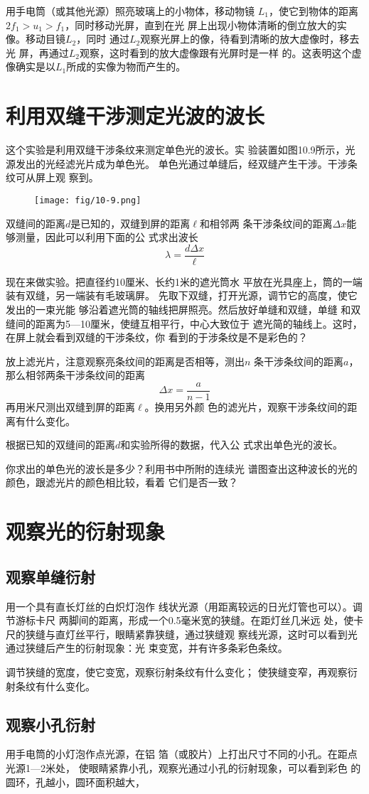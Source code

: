 用手电筒（或其他光源）照亮玻璃上的小物体，移动物镜
$L_1$，使它到物体的距离$2f_1>u_1>f_1$，同时移动光屏，直到在光
屏上出现小物体清晰的倒立放大的实像。移动目镜$L_2$，同时
通过$L_2$观察光屏上的像，待看到清晰的放大虚像时，移去光
屏，再通过$L_2$观察，这时看到的放大虚像跟有光屏时是一样
的。这表明这个虚像确实是以$L_1$所成的实像为物而产生的。

\section{利用双缝干涉测定光波的波长}

这个实验是利用双缝干涉条纹来测定单色光的波长。实
验装置如图10.9所示，光源发出的光经滤光片成为单色光。
单色光通过单缝后，经双缝产生干涉。干涉条纹可从屏上观
察到。
\begin{figure}[htp]\centering
    \texttt{[image: fig/10-9.png]}
    \caption{}
    \end{figure}

双缝间的距离$d$是已知的，双缝到屏的距离$\ell$和相邻两
条干涉条纹间的距离$\Delta x$能够测量，因此可以利用下面的公
式求出波长
\[\lambda=\frac{d\Delta x}{\ell} \]

现在来做实验。把直径约10厘米、长约1米的遮光筒水
平放在光具座上，筒的一端装有双缝，另一端装有毛玻璃屏。
先取下双缝，打开光源，调节它的高度，使它发出的一束光能
够沿着遮光筒的轴线把屏照亮。然后放好单缝和双缝，单缝
和双缝间的距离为5—10厘米，使缝互相平行，中心大致位于
遮光简的轴线上。这时，在屏上就会看到双缝的干涉条纹，你
看到的于涉条纹是不是彩色的？

放上滤光片，注意观察亮条纹间的距离是否相等，测出$n$
条干涉条纹间的距离$a$，那么相邻两条干涉条纹间的距离
\[\Delta x=\frac{a}{n-1} \]
再用米尺测出双缝到屏的距离$\ell$。换用另外颜
色的滤光片，观察干涉条纹间的距离有什么变化。

根据已知的双缝间的距离$d$和实验所得的数据，代入公
式求出单色光的波长。

你求出的单色光的波长是多少？利用书中所附的连续光
谱图查出这种波长的光的颜色，跟滤光片的颜色相比较，看着
它们是否一致？

\section{观察光的衍射现象}

\subsection{观察单缝衍射}

用一个具有直长灯丝的白炽灯泡作
线状光源（用距离较远的日光灯管也可以）。调节游标卡尺
两脚间的距离，形成一个0.5毫米宽的狭缝。在距灯丝几米远
处，使卡尺的狭缝与直灯丝平行，眼睛紧靠狭缝，通过狭缝观
察线光源，这时可以看到光通过狭缝后产生的衍射现象：光
束变宽，并有许多条彩色条纹。

调节狭缝的宽度，使它变宽，观察衍射条纹有什么变化；
使狭缝变窄，再观察衍射条纹有什么变化。

\subsection{观察小孔衍射}

用手电筒的小灯泡作点光源，在铝
箔（或胶片）上打出尺寸不同的小孔。在距点光源1—2米处，
使眼睛紧靠小孔，观察光通过小孔的衍射现象，可以看到彩色
的圆环，孔越小，圆环面积越大，


